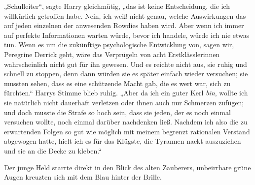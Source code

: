 „Schulleiter“, sagte Harry gleichmütig, „das ist keine Entscheidung, die ich willkürlich getroffen habe. Nein, ich weiß nicht genau, welche Auswirkungen das auf jeden einzelnen der anwesenden Rowdies haben wird. Aber wenn ich immer auf perfekte Informationen warten würde, bevor ich handele, würde ich nie etwas tun. Wenn es um die zukünftige psychologische Entwicklung von, sagen wir, Peregrine Derrick geht, wäre das Verprügeln von acht Erstklässlerinnen wahrscheinlich nicht gut für ihn gewesen. Und es reichte nicht aus, sie ruhig und schnell zu stoppen, denn dann würden sie es später einfach wieder versuchen; sie mussten sehen, dass es eine schützende Macht gab, die es wert war, sich zu fürchten.“ Harrys Stimme blieb ruhig.
„Aber da ich ein guter Kerl \emph{bin}, wollte ich sie natürlich nicht dauerhaft verletzen oder ihnen auch nur Schmerzen zufügen; und doch musste die Strafe so hoch sein, dass sie jeden, der es noch einmal versuchen wollte, noch einmal darüber nachdenken ließ. Nachdem ich also die zu erwartenden Folgen so gut wie möglich mit meinem begrenzt rationalen Verstand abgewogen hatte, hielt ich es für das Klügste, die Tyrannen nackt auszuziehen und sie an die Decke zu kleben.“

Der junge Held starrte direkt in den Blick des alten Zauberers, unbeirrbare grüne Augen kreuzten sich mit dem Blau hinter der Brille.


